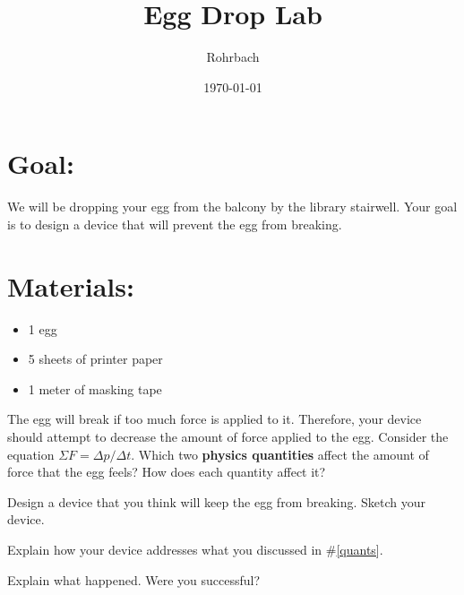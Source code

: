 \documentclass[10pt]{exam}
\title{Egg Drop Lab}
\author{Rohrbach}
\date{\today}
\begin{document}
\maketitle

\section*{Goal:} 
  We will be dropping your egg from the balcony by the library stairwell.  Your goal is to design a device that will prevent the egg from breaking.

\section*{Materials:}

\begin{itemize}
  \item 1 egg
  \item 5 sheets of printer paper
  \item 1 meter of masking tape
\end{itemize}

\vspace{-2em}

\begin{questions}
  
    \question \label{quants}
      The egg will break if too much force is applied to it.  Therefore, your device should attempt to decrease the amount of force applied to the egg.  Consider the equation $\Sigma F = \Delta p / \Delta t$.  Which two {\bf physics quantities} affect the amount of force that the egg feels?  How does each quantity affect it?
      \vs
    
    \question
      Design a device that you think will keep the egg from breaking.  Sketch your device.
      \vs[3]
    
    \question
      Explain how your device addresses what you discussed in \#\ref{quants}.
      \vs
  
  
  
    \question
      Explain what happened.  Were you successful?
      \vspace{4em}
 \end{questions} 
  
\end{document}

